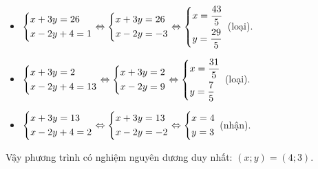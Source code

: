 \begin{ex}
{\begin{enumerate}
\begin{itemize}
       \item $\heva{&x+3y=26\\&x-2y+4=1}\Leftrightarrow \heva{&x+3y=26\\&x-2y=-3}\Leftrightarrow \heva{&x=\dfrac{43}{5}\\&y=\dfrac{29}{5}}$ (loại).
       \item $\heva{&x+3y=2\\&x-2y+4=13}\Leftrightarrow \heva{&x+3y=2\\&x-2y=9}\Leftrightarrow \heva{&x=\dfrac{31}{5}\\&y=\dfrac{7}{5}}$ (loại).
       \item $\heva{&x+3y=13\\&x-2y+4=2}\Leftrightarrow \heva{&x+3y=13\\&x-2y=-2}\Leftrightarrow \heva{&x=4\\&y=3}$ (nhận).
       \end{itemize}
       Vậy phương trình có nghiệm nguyên dương duy nhất: $(x;y)=(4;3)$.
    \end{enumerate}
    }
\end{ex}

